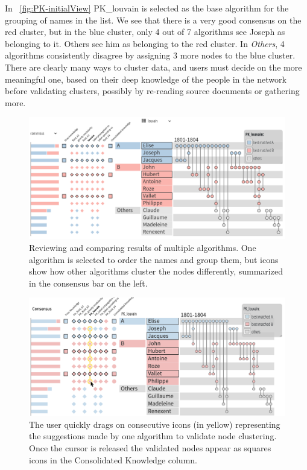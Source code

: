 In ~\autoref{fig:PK-initialView} PK\_louvain is selected as the base algorithm for the grouping of names in the list. We see that there is a very good consensus on the red cluster, but in the blue cluster, only 4 out of 7 algorithms see Joseph as belonging to it.  Others see him as belonging to the red cluster. In \emph{Others}, 4 algorithms consistently disagree by assigning 3 more nodes to the blue cluster.
There are clearly many ways to cluster data, and users must decide on the more meaningful one, based on their deep knowledge of the people in the network before validating clusters, possibly by re-reading source documents or gathering more.

\begin{figure}
\centering
\includegraphics[width=\linewidth]{static/figures/PK-Clustering/exemple-corrections/Pk-process1-correction}
\caption{Reviewing and comparing results of multiple algorithms. One algorithm is selected to order the names and group them, but icons show how other algorithms cluster the nodes differently, summarized in the consensus bar on the left.}
\label{fig:PK-initialView}
\end{figure}


\begin{figure}
\centering
\includegraphics[width=\linewidth]{static/figures/PK-Clustering/exemple-corrections/MB-sample-validating-correct}
\caption{The user quickly drags on consecutive icons (in yellow) representing the suggestions made by one algorithm to validate node clustering. Once the cursor is released the validated nodes appear as squares icons in the Consolidated Knowledge column.}
\label{fig:PK-multipleValidation}
\end{figure}

